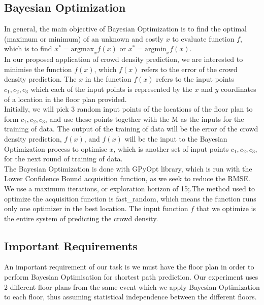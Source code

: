 \documentclass[letterpaper]{article}
\begin{document}
\subsection{Bayesian Optimization}

In general, the main objective of Bayesian Optimization is to find the optimal (maximum or minimum) of an unknown and costly $x$ to evaluate function $f$, which is to find $x^* = \text{argmax}_x f(x)$ or $x^* = \text{argmin}_x f(x)$. \\

In our proposed application of crowd density prediction, we are interested to minimise the function $f(x)$, which $f(x)$ refers to the error of the crowd density prediction. The $x$ in the function $f(x)$ refers to the input points $c_1, c_2, c_3$ which each of the input points is represented by the $x$ and $y$ coordinates of a location in the floor plan provided.  \\

Initially, we will pick 3 random input points of the locations of the floor plan to form $c_1, c_2, c_3$, and use these points together with the M as the inputs for the training of data. The output of the training of data will be the error of the crowd density prediction, $f(x)$, and $f(x)$ will be the input to the Bayesian Optimization process to optimise $x$, which is another set of input points $c_1, c_2, c_3$, for the next round of training of data. \\

The Bayesian Optimization is done with GPyOpt library, which is run with the Lower Confidence Bound acquisition function, as we seek to reduce the RMSE. We use a maximum iterations, or exploration horizon of 15;.The method used to optimize the acquisition function is fast\_random, which means the function runs only one optimizer in the best location. The input function $f$ that we optimize is the entire system of predicting the crowd density.

\subsection{Important Requirements}

An important requirement of our task is we must have the floor plan in order to perform Bayesian Optimisation for shortest path prediction. Our experiment uses 2 different floor plans from the same event which we apply Bayesian Optimization to each floor, thus assuming statistical independence between the different floors.\\
\end{document}
